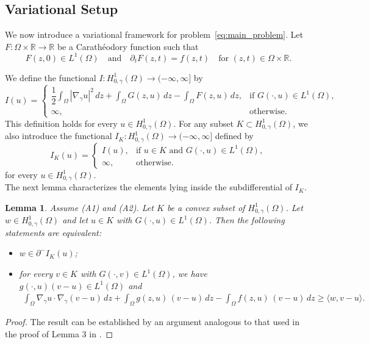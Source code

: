 \documentclass[11pt]{article}
\newtheorem{lemma}{Lemma}[section] %
\newcommand{\gradgr}{\nabla_{\gamma}}
\newcommand{\spacegr}{H^{1}_{0,\gamma}(\Omega)}
\begin{document}
\subsection{Variational Setup}
We now introduce a variational framework for problem~\eqref{eq:main_problem}. 
Let $F : \Omega \times \mathbb{R} \to \mathbb{R}$ be a Carath\'eodory function such that
\begin{equation*}
F(z,0) \in L^{1}(\Omega)
\quad \text{and} \quad
\partial_t F(z,t) = f(z,t)
\quad \text{for } (z,t) \in \Omega \times \mathbb{R}.
\end{equation*}

We define the functional $I : \spacegr \to (-\infty,\infty]$ by
\begin{equation*}
I(u) =
\begin{cases}
\dfrac{1}{2} \displaystyle\int_{\Omega} |\gradgr u|^{2}\,dz
+ \displaystyle\int_{\Omega} G(z,u)\,dz
- \displaystyle\int_{\Omega} F(z,u)\,dz,
& \text{if } G(\cdot,u) \in L^{1}(\Omega), \\[1.2ex]
\infty, & \text{otherwise}.
\end{cases}
\end{equation*}
This definition holds for every $u \in \spacegr$. 
For any subset $K \subset \spacegr$, we also introduce the functional
$I_K : \spacegr \to (-\infty,\infty]$ defined by
\begin{equation}
\label{eq:definition_of_IK}
I_K(u) =
\begin{cases}
I(u), & \text{if } u \in K \text{ and } G(\cdot,u) \in L^{1}(\Omega), \\
\infty, & \text{otherwise}.
\end{cases}
\end{equation}
for every $u \in \spacegr$. \\
The next lemma characterizes the elements lying inside the subdifferential of $I_K$.

\begin{lemma}
\label{lem:variational_inequality_characterization}
Assume \textnormal{(A1)} and \textnormal{(A2)}. 
Let $K$ be a convex subset of $\spacegr$. 
Let $w \in \spacegr$ and let $u \in K$ with $G(\cdot,u) \in L^{1}(\Omega)$. 
Then the following statements are equivalent:
\begin{itemize}
  \item[(i)] $w \in \partial^{-} I_K(u)$;
  \item[(ii)] for every $v \in K$ with $G(\cdot,v) \in L^{1}(\Omega)$, we have  $g(\cdot,u)(v-u) \in L^{1}(\Omega)$ and
  \begin{equation*}
  \begin{aligned}
  \int_{\Omega} \gradgr u \cdot \gradgr (v-u)\, dz
  + \int_{\Omega} g(z,u)\,(v-u)\, dz
  - \int_{\Omega} f(z,u)\,(v-u)\, dz
  \ge \langle w, v-u \rangle .
  \end{aligned}
  \end{equation*}
\end{itemize}
\end{lemma}
\begin{proof}
The result can be established by an argument analogous to that used in the proof of Lemma 3 in \cite{hirano_concave_convex}.
\end{proof}
\end{document}
